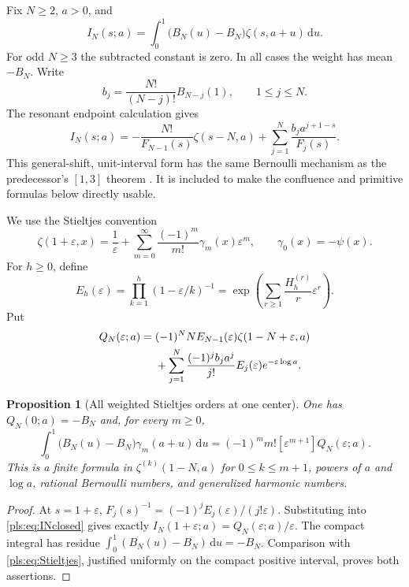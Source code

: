 \documentclass[11pt,letterpaper]{article}
\numberwithin{equation}{section}
\newtheorem{proposition}[theorem]{Proposition}
\theoremstyle{definition}
\theoremstyle{remark}\newtheorem{remark}[theorem]{Remark}
\newcommand{\dd}{\,\mathrm d}
\begin{document}
Fix $N\ge2$, $a>0$, and
\begin{equation}\label{pls:eq:IN}
 I_N(s;a)=\int_0^1\bigl(B_N(u)-B_N\bigr)\zeta(s,a+u)\dd u.
\end{equation}
For odd $N\ge3$ the subtracted constant is zero. In all cases the
weight has mean $-B_N$. Write
\begin{equation}\label{pls:eq:bNgeneral}
 b_j=\frac{N!}{(N-j)!}B_{N-j}(1),\qquad 1\le j\le N.
\end{equation}
The resonant endpoint calculation gives
\begin{equation}\label{pls:eq:INclosed}
 \boxed{\displaystyle
 I_N(s;a)=-\frac{N!}{F_{N-1}(s)}\zeta(s-N,a)
          +\sum_{j=1}^N\frac{b_j a^{j+1-s}}{F_j(s)}.}
\end{equation}
This general-shift, unit-interval form has the same Bernoulli mechanism
as the predecessor's $[1,3]$ theorem \cite{Affine}. It is included to
make the confluence and primitive formulas below directly usable.

We use the Stieltjes convention
\begin{equation}\label{pls:eq:Stieltjes}
 \zeta(1+\varepsilon,x)=\frac1\varepsilon
     +\sum_{m=0}^\infty\frac{(-1)^m}{m!}\gamma_m(x)
                                               \varepsilon^m,
 \qquad \gamma_0(x)=-\psi(x).
\end{equation}
For $h\ge0$, define
\begin{equation}\label{pls:eq:Eh}
 E_h(\varepsilon)=\prod_{k=1}^h(1-\varepsilon/k)^{-1}
   =\exp\left(\sum_{r\ge1}\frac{H_h^{(r)}}r\varepsilon^r\right).
\end{equation}
Put
\begin{align}
 Q_N(\varepsilon;a)
 ={}&(-1)^N N E_{N-1}(\varepsilon)\zeta(1-N+\varepsilon,a)
        \notag\\
 &+\sum_{j=1}^N\frac{(-1)^j b_j a^j}{j!}
            E_j(\varepsilon)e^{-\varepsilon\log a}.
\label{pls:eq:QN}
\end{align}

\begin{proposition}[All weighted Stieltjes orders at one center]
\label{pls:prop:Stieltjes}
One has $Q_N(0;a)=-B_N$ and, for every $m\ge0$,
\begin{equation}\label{pls:eq:Stieltjesmoments}
 \boxed{\displaystyle
 \int_0^1\bigl(B_N(u)-B_N\bigr)\gamma_m(a+u)\dd u
   =(-1)^m m![\varepsilon^{m+1}]Q_N(\varepsilon;a).}
\end{equation}
This is a finite formula in $\zeta^{(k)}(1-N,a)$ for
$0\le k\le m+1$, powers of $a$ and $\log a$, rational Bernoulli
numbers, and generalized harmonic numbers.
\end{proposition}
\begin{proof}
At $s=1+\varepsilon$,
$F_j(s)^{-1}=(-1)^j E_j(\varepsilon)/(j!\varepsilon)$.
Substituting into \eqref{pls:eq:INclosed} gives exactly
$I_N(1+\varepsilon;a)=Q_N(\varepsilon;a)/\varepsilon$.
The compact integral has residue $\int_0^1(B_N(u)-B_N)\dd u=-B_N$.
Comparison with \eqref{pls:eq:Stieltjes}, justified uniformly on the
compact positive interval, proves both assertions.
\end{proof}
\end{document}
